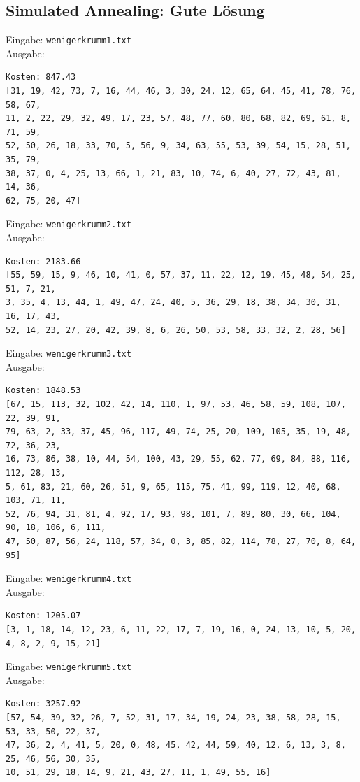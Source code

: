 \documentclass[a4paper,10pt,ngerman]{scrartcl}
\begin{document}
\subsection{Simulated Annealing: Gute Lösung}
Eingabe: \lstinline|wenigerkrumm1.txt| \\ Ausgabe:
\begin{lstlisting}
Kosten: 847.43
[31, 19, 42, 73, 7, 16, 44, 46, 3, 30, 24, 12, 65, 64, 45, 41, 78, 76, 58, 67,
11, 2, 22, 29, 32, 49, 17, 23, 57, 48, 77, 60, 80, 68, 82, 69, 61, 8, 71, 59,
52, 50, 26, 18, 33, 70, 5, 56, 9, 34, 63, 55, 53, 39, 54, 15, 28, 51, 35, 79,
38, 37, 0, 4, 25, 13, 66, 1, 21, 83, 10, 74, 6, 40, 27, 72, 43, 81, 14, 36, 
62, 75, 20, 47]
\end{lstlisting}
Eingabe: \lstinline|wenigerkrumm2.txt| \\ Ausgabe:
\begin{lstlisting}
Kosten: 2183.66
[55, 59, 15, 9, 46, 10, 41, 0, 57, 37, 11, 22, 12, 19, 45, 48, 54, 25, 51, 7, 21,
3, 35, 4, 13, 44, 1, 49, 47, 24, 40, 5, 36, 29, 18, 38, 34, 30, 31, 16, 17, 43,
52, 14, 23, 27, 20, 42, 39, 8, 6, 26, 50, 53, 58, 33, 32, 2, 28, 56]
\end{lstlisting}
Eingabe: \lstinline|wenigerkrumm3.txt| \\ Ausgabe:
\begin{lstlisting}
Kosten: 1848.53
[67, 15, 113, 32, 102, 42, 14, 110, 1, 97, 53, 46, 58, 59, 108, 107, 22, 39, 91, 
79, 63, 2, 33, 37, 45, 96, 117, 49, 74, 25, 20, 109, 105, 35, 19, 48, 72, 36, 23,
16, 73, 86, 38, 10, 44, 54, 100, 43, 29, 55, 62, 77, 69, 84, 88, 116, 112, 28, 13, 
5, 61, 83, 21, 60, 26, 51, 9, 65, 115, 75, 41, 99, 119, 12, 40, 68, 103, 71, 11, 
52, 76, 94, 31, 81, 4, 92, 17, 93, 98, 101, 7, 89, 80, 30, 66, 104, 90, 18, 106, 6, 111, 
47, 50, 87, 56, 24, 118, 57, 34, 0, 3, 85, 82, 114, 78, 27, 70, 8, 64, 95]
\end{lstlisting}
Eingabe: \lstinline|wenigerkrumm4.txt| \\ Ausgabe:
\begin{lstlisting}
Kosten: 1205.07
[3, 1, 18, 14, 12, 23, 6, 11, 22, 17, 7, 19, 16, 0, 24, 13, 10, 5, 20, 4, 8, 2, 9, 15, 21]
\end{lstlisting}
Eingabe: \lstinline|wenigerkrumm5.txt| \\ Ausgabe:
\begin{lstlisting}
Kosten: 3257.92
[57, 54, 39, 32, 26, 7, 52, 31, 17, 34, 19, 24, 23, 38, 58, 28, 15, 53, 33, 50, 22, 37, 
47, 36, 2, 4, 41, 5, 20, 0, 48, 45, 42, 44, 59, 40, 12, 6, 13, 3, 8, 25, 46, 56, 30, 35, 
10, 51, 29, 18, 14, 9, 21, 43, 27, 11, 1, 49, 55, 16]
\end{lstlisting}
\end{document}
